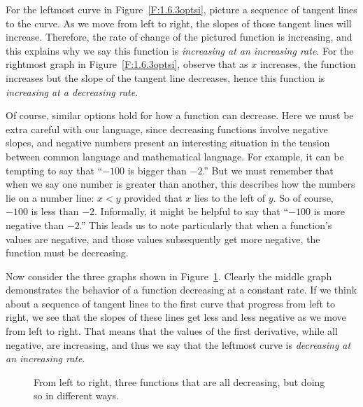 For the leftmost curve in Figure~\ref{F:1.6.3optsi}, picture a sequence of tangent lines to the curve.  As we move from left to right, the slopes of those tangent lines will increase.  Therefore, the rate of change of the pictured function is increasing, and this explains why we say this function is \emph{increasing at an increasing rate}.  For the rightmost graph in Figure~\ref{F:1.6.3optsi}, observe that as $x$ increases, the function increases but the slope of the tangent line decreases, hence this function is \emph{increasing at a decreasing rate}.

Of course, similar options hold for how a function can decrease.  Here we must be extra careful with our language, since decreasing functions involve negative slopes, and negative numbers present an interesting situation in the tension between common language and mathematical language.  For example, it can be tempting to say that ``$-100$ is bigger than $-2$.''  But we must remember that when we say one number is greater than another, this describes how the numbers lie on a number line:  $x < y$ provided that $x$ lies to the left of $y$.  So of course, $-100$ is less than $-2$.  Informally, it might be helpful to say that ``$-100$ is more negative than $-2$.''  This leads us to note particularly that when a function's values are negative, and those values subsequently get more negative, the function must be decreasing.

Now consider the three graphs shown in Figure~\ref{F:1.6.3optsd}.  Clearly the middle graph demonstrates the behavior of a function decreasing at a constant rate.  If we think about a sequence of tangent lines to the first curve that progress from left to right, we see that the slopes of these lines get less and less negative as we move from left to right.  That means that the values of the first derivative, while all negative, are increasing, and thus we say that the leftmost curve is \emph{decreasing at an increasing rate}.

\begin{figure}[ht]
\begin{center}
\caption{From left to right, three functions that are all decreasing, but doing so in different ways.} \label{F:1.6.3optsd}
\end{center}
\end{figure}

